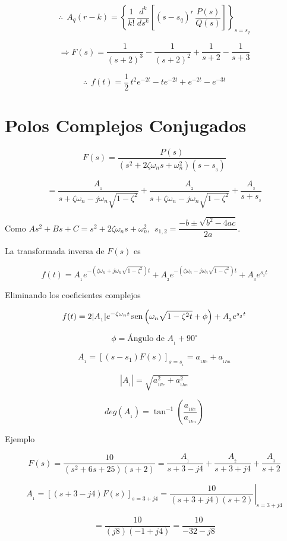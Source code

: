 $$\therefore\:\: A_{q}(r - k) = \left\lbrace \dfrac{1}{k!}\,\dfrac{d^k}{ds^k} \left[ (s - s_{q})^r \, \dfrac{P(s)}{Q(s)} \right] \right\rbrace_{s = s_{q}}$$

$$\Rightarrow F(s) = \dfrac{1}{(s + 2)^3} - \dfrac{1}{(s + 2)^2} + \dfrac{1}{s + 2} - \dfrac{1}{s + 3}$$

$$\therefore \:\: f(t) = \dfrac{1}{2}\, t^2 e^{-2t} - te^{-2t} + e^{-2t} - e^{-3t}$$


\section{Polos Complejos Conjugados}

$$F(s) = \dfrac{P(s)}{(s^2 + 2\zeta \omega_{n}s + \omega_{n}^2)(s - s_{_{3}})}$$

$$= \dfrac{A_{_{1}}}{s + \zeta \omega_{n} - j\omega_{n} \sqrt{1 - \zeta^2}} + \dfrac{A_{_{2}}}{s + \zeta \omega_{n} - j\omega_{n} \sqrt{1 - \zeta^2}} + \dfrac{A_{_{3}}}{s + s_{_3}}$$

Como $As^2 + Bs + C = s^2 + 2\zeta \omega_{n}s +\omega_{n}^{2}$, $\: s_{1,2} = \dfrac{- b \pm \sqrt{b^2 - 4ac}}{2a}.$

La transformada inversa de $F(s)$ es

$$f(t) = A_{_{1}} e^{- \left( \zeta \omega_{n} + j\omega_{n} \sqrt{1 - \zeta^2} \right)t } + A_{_2} e^{- \left( \zeta \omega_{n} - j\omega_{n} \sqrt{1 - \zeta^2} \right)t } + A_{_3} e^{s_{_3} t}$$

Eliminando los coeficientes complejos

$$f(t) = 2 |A_{_1}| e^{-\zeta \omega_{n}t} \mathop{\rm sen}\nolimits \left( \omega_{n} \sqrt{1 - \zeta^2 t} + \phi \right) + A_{_3}e^{s_{_3}t}$$

$$\phi = \mbox{Ángulo de } A_{_1} + 90^\circ$$

$$A_{_1} = \left[ (s - s_1)F(s)\right]_{s = s_{_1}} = a_{_{1Re}} + a_{_{1Im}}$$

$$|A_{_1}| = \sqrt{a_{_{1Re}}^2 + a_{_{1Im}}^2}$$

$$deg(A_{_1}) = \tan^{-1} \left( \dfrac{a_{_{1Re}}}{a_{_{1Im}}} \right) $$

Ejemplo

$$F(s) = \dfrac{10}{(s^2 + 6s + 25)(s + 2)} = \dfrac{A_{_1}}{s + 3 - j4} + \dfrac{A_{_2}}{s + 3 + j4} + \dfrac{A_{_3}}{s + 2}$$

$$A_{_1} = \left[ (s + 3 - j4) F(s) \right]_{s = 3 + j4} = \left. \dfrac{10}{(s + 3 + j4)(s + 2)} \right|_{s = 3 + j4}$$

$$= \dfrac{10}{(j8)(-1 + j4)} = \dfrac{10}{-32 - j8}$$

